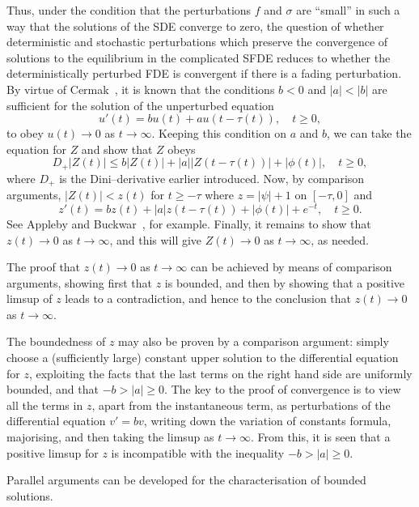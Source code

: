 \documentclass[a4paper,10pt,reqno]{amsart}
\numberwithin{equation}{section}
\theoremstyle{definition}
\theoremstyle{remark}
\DeclareMathOperator{\1}{\mathbbm 1}
\begin{document}
Thus, under the condition that the perturbations $f$ and $\sigma$ are ``small'' in such a way that the solutions of the SDE converge to zero, the question of whether deterministic and stochastic perturbations which preserve the convergence of solutions to the equilibrium in the complicated SFDE reduces to whether the deterministically perturbed FDE is convergent if there is a fading perturbation. By virtue of Cermak~\cite{cermak}, it is known that the conditions $b<0$ and $|a|<|b|$ are sufficient for the solution of the unperturbed equation 
\[
u'(t)=bu(t)+au(t-\tau(t)), \quad t\geq 0,
\]
to obey $u(t)\to 0$ as $t\to\infty$. Keeping this condition on $a$ and $b$, we can take the equation for $Z$ and show that $Z$ obeys
\[
D_+|Z(t)|\leq b|Z(t)|+|a||Z(t-\tau(t))|+|\phi(t)|,\quad t\geq 0,
\]
where $D_+$ is the Dini--derivative earlier introduced. Now, by comparison arguments, $|Z(t)| < z(t)$ for $t\geq -\tau$ where $z=|\psi|+1$ on $[-\tau,0]$ and 
\[
z'(t)=bz(t)+|a|z(t-\tau(t))+|\phi(t)|+e^{-t}, \quad t\geq 0.
\]
See Appleby and Buckwar~\cite{AppBuck10}, for example. Finally, it remains to show that $z(t)\to 0$ as $t\to\infty$, and this will give $Z(t)\to 0$ as $t\to\infty$, as needed. 

The proof that $z(t)\to 0$ as $t\to\infty$ can be achieved by means of comparison arguments, showing first that $z$ is bounded, and then by showing that a positive limsup of $z$ leads to a contradiction, and hence to the conclusion that $z(t)\to 0$ as $t\to\infty$. 

The boundedness of $z$ may also be proven by a comparison argument: simply choose a (sufficiently large) constant upper solution to the differential equation for $z$, exploiting the facts that the last terms on the right hand side are uniformly bounded, and that $-b>|a|\geq 0$. The key to the proof of convergence is to view all the terms in $z$, apart from the instantaneous term, as perturbations of the differential equation $v'=bv$,  writing down the variation of constants formula, majorising, and then taking the limsup as $t\to\infty$. From this, it is seen that a positive limsup for $z$ is incompatible with the inequality $-b>|a|\geq 0$.  

Parallel arguments can be developed for the characterisation of bounded solutions. 
\end{document}
